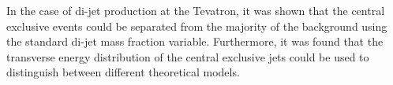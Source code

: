 \documentclass[12pt]{article}
\begin{document}
In the case of di-jet production at the Tevatron, it was shown that the central exclusive events could be separated from the majority of the background using the standard di-jet mass fraction variable. Furthermore, it was found that the transverse energy distribution of the central exclusive jets could be used to distinguish between different theoretical models.  

\thispagestyle{empty}
\end{document}
